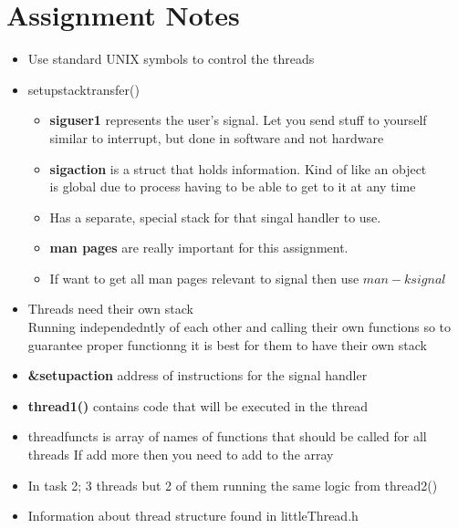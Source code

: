 \documentclass{article}
\newcommand\tab[1][0.5cm]{\hspace*{#1}}
\begin{document}
\section{Assignment Notes}
	\begin{itemize}
		\item Use standard UNIX symbols to control the threads

		\item setupstacktransfer()
		\begin{itemize} 
			\item \textbf{siguser1}	represents the user's signal. Let you send stuff to yourself
			\\ \tab similar to interrupt, but done in software and not hardware

			\item \textbf{sigaction} is a struct that holds information. Kind of like an object
			\\ \tab is global due to process having to be able to get to it at any time

			\item Has a separate, special stack for that singal handler to use.
			\item \textbf{man pages} are really important for this assignment. 
			\item If want to get all man pages relevant to signal then use $man -k signal$
		\end{itemize}

		\item Threads need their own stack
			\\ \tab Running independedntly of each other and calling their own functions so to guarantee proper functionng it is best for them to have their own stack

		\item \textbf{\&setupaction}
			address of instructions for the signal handler

		\item \textbf{thread1()}
		contains code that will be executed in the thread

		\item threadfuncts is array of names of functions that should be called for all threads
		If add more then you need to add to the array

		\item In task 2; 3 threads but 2 of them running the same logic from thread2()

		\item Information about thread structure found in littleThread.h


\end{itemize}
\end{document}
